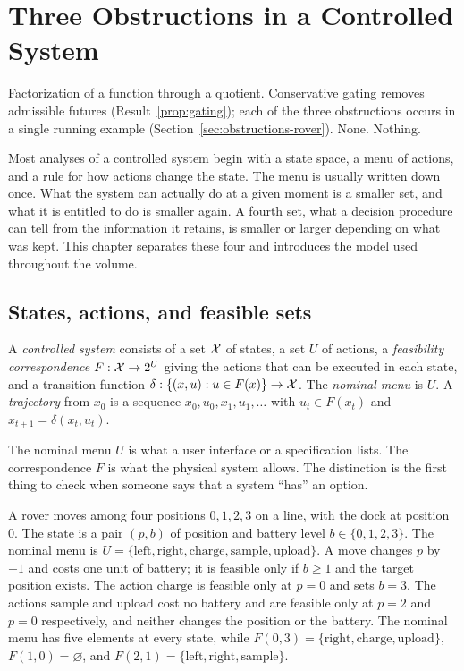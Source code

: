 \chapter{Three Obstructions in a Controlled System}\label{ch:common}
{Factorization of a function through a quotient.}
{Conservative gating removes admissible futures (Result~\ref{prop:gating}); each of the three obstructions occurs in a single running example (Section~\ref{sec:obstructions-rover}).}
{None.}
{Nothing.}

Most analyses of a controlled system begin with a state space, a menu of actions, and a rule for how actions change the state. The menu is usually written down once. What the system can actually do at a given moment is a smaller set, and what it is entitled to do is smaller again. A fourth set, what a decision procedure can tell from the information it retains, is smaller or larger depending on what was kept. This chapter separates these four and introduces the model used throughout the volume.

\section{States, actions, and feasible sets}\label{sec:systems}

\begin{definition}\label{def:controlled}
A \emph{controlled system} consists of a set $\mathcal{X}$ of states, a set $U$ of actions, a \emph{feasibility correspondence} $F:\mathcal{X}\to2^{U}$ giving the actions that can be executed in each state, and a transition function $\delta:\{(x,u):u\in F(x)\}\to\mathcal{X}$. The \emph{nominal menu} is $U$. A \emph{trajectory} from $x_0$ is a sequence $x_0,u_0,x_1,u_1,\dots$ with $u_t\in F(x_t)$ and $x_{t+1}=\delta(x_t,u_t)$.
\end{definition}

The nominal menu $U$ is what a user interface or a specification lists. The correspondence $F$ is what the physical system allows. The distinction is the first thing to check when someone says that a system ``has'' an option.

\begin{example}\label{ex:rover}
A rover moves among four positions $0,1,2,3$ on a line, with the dock at position $0$. The state is a pair $(p,b)$ of position and battery level $b\in\{0,1,2,3\}$. The nominal menu is $U=\{\mathrm{left},\mathrm{right},\mathrm{charge},\mathrm{sample},\mathrm{upload}\}$. A move changes $p$ by $\pm1$ and costs one unit of battery; it is feasible only if $b\ge1$ and the target position exists. The action $\mathrm{charge}$ is feasible only at $p=0$ and sets $b=3$. The actions $\mathrm{sample}$ and $\mathrm{upload}$ cost no battery and are feasible only at $p=2$ and $p=0$ respectively, and neither changes the position or the battery. The nominal menu has five elements at every state, while $F(0,3)=\{\mathrm{right},\mathrm{charge},\mathrm{upload}\}$, $F(1,0)=\varnothing$, and $F(2,1)=\{\mathrm{left},\mathrm{right},\mathrm{sample}\}$.
\end{example}

